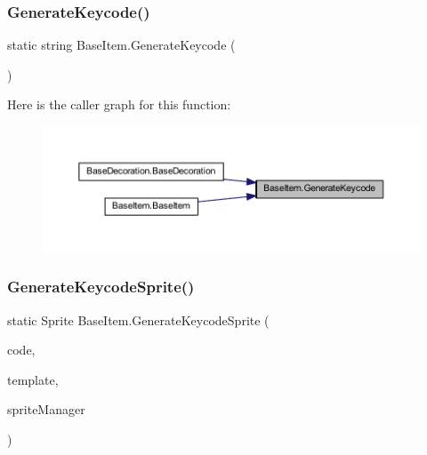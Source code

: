 \subsubsection{\texorpdfstring{GenerateKeycode()}{GenerateKeycode()}}
{\footnotesize\ttfamily static string Base\+Item.\+Generate\+Keycode (\begin{DoxyParamCaption}{ }\end{DoxyParamCaption})\hspace{0.3cm}{\ttfamily [static]}}

Here is the caller graph for this function\+:\nopagebreak
\begin{figure}[H]
\begin{center}
\leavevmode
\includegraphics[width=350pt]{class_base_item_aa3a6bc4a2af6c424898277764e9c0585_icgraph}
\end{center}
\end{figure}
\mbox{\label{class_base_item_a0bb5888f3371b291645137272f417b30}} 
\subsubsection{\texorpdfstring{GenerateKeycodeSprite()}{GenerateKeycodeSprite()}}
{\footnotesize\ttfamily static Sprite Base\+Item.\+Generate\+Keycode\+Sprite (\begin{DoxyParamCaption}\item[{string}]{code,  }\item[{Sprite}]{template,  }\item[{\mbox{\hyperlink{class_sprite_manager}{Sprite\+Manager}}}]{sprite\+Manager }\end{DoxyParamCaption})\hspace{0.3cm}{\ttfamily [static]}}

